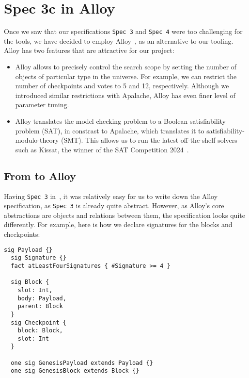 
\section{Spec 3c in Alloy}\label{sec:alloy}

Once we saw that our specifications \texttt{Spec 3} and \texttt{Spec 4}
were too challenging for the \tlap{} tools, we have decided to employ
Alloy~\cite{jackson2012software,alloytools}, as an alternative to our tooling.
Alloy has two features that are attractive for our project:

\begin{itemize}

  \item Alloy allows to precisely control the search scope by setting the
      number of objects of particular type in the universe. For example, we can
      restrict the number of checkpoints and votes to 5 and 12, respectively.
      Although we introduced similar restrictions with Apalache, Alloy has even
      finer level of parameter tuning.

  \item Alloy translates the model checking problem to a Boolean satisfiability
      problem (SAT), in constrast to Apalache, which translates it to satisfiability-modulo-theory (SMT).  This
      allows us to run the latest off-the-shelf solvers such as Kissat, the
      winner of the SAT Competition 2024~\cite{SAT-Competition-2024-solvers}.

\end{itemize}

\subsection{From \tlap{} to Alloy}

Having \texttt{Spec 3} in~\tlap{}, it was relatively easy for us to write down
the Alloy specification, as \texttt{Spec 3} is already quite abstract. However, as
Alloy's core abstractions are objects and relations between them, the
specification looks quite differently. For example, here is how we declare
signatures for the blocks and checkpoints:

\begin{lstlisting}[language=alloy,columns=fullflexible]
  sig Payload {}
  sig Signature {}
  fact atLeastFourSignatures { #Signature >= 4 }

  sig Block {
    slot: Int,
    body: Payload,
    parent: Block
  }
  sig Checkpoint {
    block: Block,
    slot: Int
  }

  one sig GenesisPayload extends Payload {}
  one sig GenesisBlock extends Block {}
\end{lstlisting}

